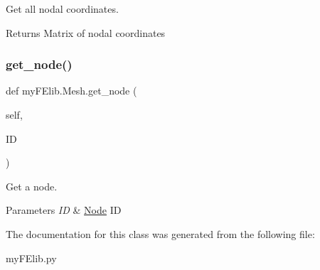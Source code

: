 Get all nodal coordinates. 

\begin{DoxyReturn}{Returns}
Matrix of nodal coordinates 
\end{DoxyReturn}
\mbox{\label{classmyFElib_1_1Mesh_a731a484349d4f45154745a8d905a417b}} 
\subsubsection{\texorpdfstring{get\+\_\+node()}{get\_node()}}
{\footnotesize\ttfamily def my\+F\+Elib.\+Mesh.\+get\+\_\+node (\begin{DoxyParamCaption}\item[{}]{self,  }\item[{}]{ID }\end{DoxyParamCaption})}



Get a node. 


\begin{DoxyParams}{Parameters}
{\em ID} & \mbox{\hyperlink{classmyFElib_1_1Node}{Node}} ID \\
\hline
\end{DoxyParams}


The documentation for this class was generated from the following file\+:\begin{DoxyCompactItemize}
\item 
my\+F\+Elib.\+py\end{DoxyCompactItemize}
